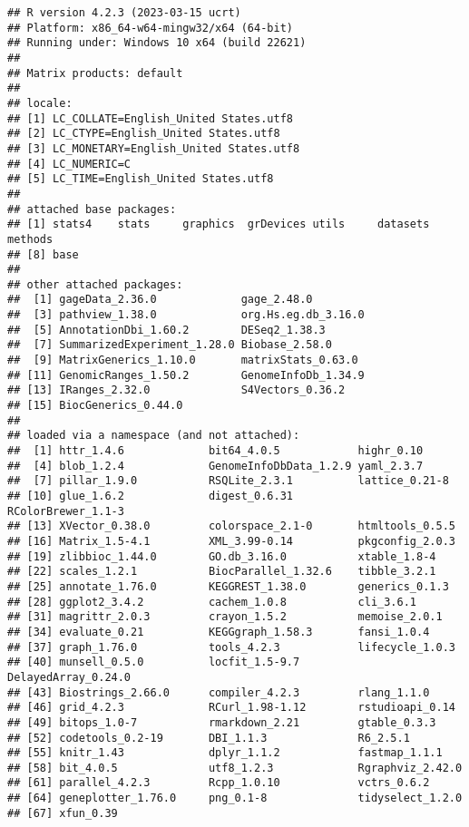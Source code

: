 \documentclass[
]{article}
\begin{document}
\begin{verbatim}
## R version 4.2.3 (2023-03-15 ucrt)
## Platform: x86_64-w64-mingw32/x64 (64-bit)
## Running under: Windows 10 x64 (build 22621)
## 
## Matrix products: default
## 
## locale:
## [1] LC_COLLATE=English_United States.utf8 
## [2] LC_CTYPE=English_United States.utf8   
## [3] LC_MONETARY=English_United States.utf8
## [4] LC_NUMERIC=C                          
## [5] LC_TIME=English_United States.utf8    
## 
## attached base packages:
## [1] stats4    stats     graphics  grDevices utils     datasets  methods  
## [8] base     
## 
## other attached packages:
##  [1] gageData_2.36.0             gage_2.48.0                
##  [3] pathview_1.38.0             org.Hs.eg.db_3.16.0        
##  [5] AnnotationDbi_1.60.2        DESeq2_1.38.3              
##  [7] SummarizedExperiment_1.28.0 Biobase_2.58.0             
##  [9] MatrixGenerics_1.10.0       matrixStats_0.63.0         
## [11] GenomicRanges_1.50.2        GenomeInfoDb_1.34.9        
## [13] IRanges_2.32.0              S4Vectors_0.36.2           
## [15] BiocGenerics_0.44.0        
## 
## loaded via a namespace (and not attached):
##  [1] httr_1.4.6             bit64_4.0.5            highr_0.10            
##  [4] blob_1.2.4             GenomeInfoDbData_1.2.9 yaml_2.3.7            
##  [7] pillar_1.9.0           RSQLite_2.3.1          lattice_0.21-8        
## [10] glue_1.6.2             digest_0.6.31          RColorBrewer_1.1-3    
## [13] XVector_0.38.0         colorspace_2.1-0       htmltools_0.5.5       
## [16] Matrix_1.5-4.1         XML_3.99-0.14          pkgconfig_2.0.3       
## [19] zlibbioc_1.44.0        GO.db_3.16.0           xtable_1.8-4          
## [22] scales_1.2.1           BiocParallel_1.32.6    tibble_3.2.1          
## [25] annotate_1.76.0        KEGGREST_1.38.0        generics_0.1.3        
## [28] ggplot2_3.4.2          cachem_1.0.8           cli_3.6.1             
## [31] magrittr_2.0.3         crayon_1.5.2           memoise_2.0.1         
## [34] evaluate_0.21          KEGGgraph_1.58.3       fansi_1.0.4           
## [37] graph_1.76.0           tools_4.2.3            lifecycle_1.0.3       
## [40] munsell_0.5.0          locfit_1.5-9.7         DelayedArray_0.24.0   
## [43] Biostrings_2.66.0      compiler_4.2.3         rlang_1.1.0           
## [46] grid_4.2.3             RCurl_1.98-1.12        rstudioapi_0.14       
## [49] bitops_1.0-7           rmarkdown_2.21         gtable_0.3.3          
## [52] codetools_0.2-19       DBI_1.1.3              R6_2.5.1              
## [55] knitr_1.43             dplyr_1.1.2            fastmap_1.1.1         
## [58] bit_4.0.5              utf8_1.2.3             Rgraphviz_2.42.0      
## [61] parallel_4.2.3         Rcpp_1.0.10            vctrs_0.6.2           
## [64] geneplotter_1.76.0     png_0.1-8              tidyselect_1.2.0      
## [67] xfun_0.39
\end{verbatim}
\end{document}

